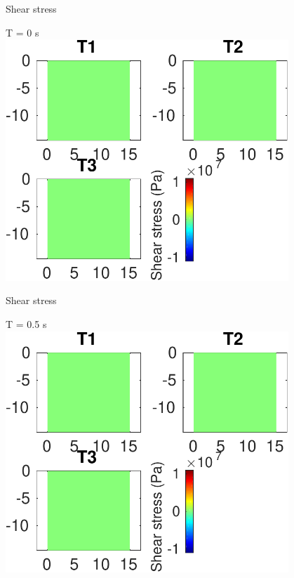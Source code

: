 \documentclass{beamer}
\begin{document}
\begin{frame}
 {Shear stress}
 
 \centering \Large T = 0 s\\
 \includegraphics[width=0.8\textwidth]{images/vertical_00006}
 
\end{frame}

\begin{frame}
 {Shear stress}
 
 \centering \Large T = 0.5 s\\
 \includegraphics[width=0.8\textwidth]{images/vertical_00011}
 
\end{frame}
\end{document}
